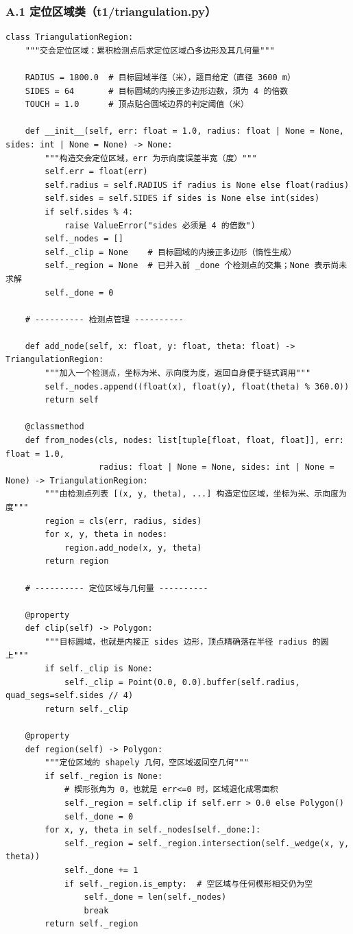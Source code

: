 \documentclass[UTF8, zihao=5,AutoFakeBold=2]{ctexart}
\begin{document}
	\subsubsection*{A.1 \quad 定位区域类（t1/triangulation.py）}
	\begin{lstlisting}
class TriangulationRegion:
    """交会定位区域：累积检测点后求定位区域凸多边形及其几何量"""

    RADIUS = 1800.0  # 目标圆域半径（米），题目给定（直径 3600 m）
    SIDES = 64       # 目标圆域的内接正多边形边数，须为 4 的倍数
    TOUCH = 1.0      # 顶点贴合圆域边界的判定阈值（米）

    def __init__(self, err: float = 1.0, radius: float | None = None, sides: int | None = None) -> None:
        """构造交会定位区域，err 为示向度误差半宽（度）"""
        self.err = float(err)
        self.radius = self.RADIUS if radius is None else float(radius)
        self.sides = self.SIDES if sides is None else int(sides)
        if self.sides % 4:
            raise ValueError("sides 必须是 4 的倍数")
        self._nodes = []
        self._clip = None    # 目标圆域的内接正多边形（惰性生成）
        self._region = None  # 已并入前 _done 个检测点的交集；None 表示尚未求解
        self._done = 0

    # ---------- 检测点管理 ----------

    def add_node(self, x: float, y: float, theta: float) -> TriangulationRegion:
        """加入一个检测点，坐标为米、示向度为度，返回自身便于链式调用"""
        self._nodes.append((float(x), float(y), float(theta) % 360.0))
        return self

    @classmethod
    def from_nodes(cls, nodes: list[tuple[float, float, float]], err: float = 1.0,
                   radius: float | None = None, sides: int | None = None) -> TriangulationRegion:
        """由检测点列表 [(x, y, theta), ...] 构造定位区域，坐标为米、示向度为度"""
        region = cls(err, radius, sides)
        for x, y, theta in nodes:
            region.add_node(x, y, theta)
        return region

    # ---------- 定位区域与几何量 ----------

    @property
    def clip(self) -> Polygon:
        """目标圆域，也就是内接正 sides 边形，顶点精确落在半径 radius 的圆上"""
        if self._clip is None:
            self._clip = Point(0.0, 0.0).buffer(self.radius, quad_segs=self.sides // 4)
        return self._clip

    @property
    def region(self) -> Polygon:
        """定位区域的 shapely 几何，空区域返回空几何"""
        if self._region is None:
            # 楔形张角为 0，也就是 err<=0 时，区域退化成零面积
            self._region = self.clip if self.err > 0.0 else Polygon()
            self._done = 0
        for x, y, theta in self._nodes[self._done:]:
            self._region = self._region.intersection(self._wedge(x, y, theta))
            self._done += 1
            if self._region.is_empty:  # 空区域与任何楔形相交仍为空
                self._done = len(self._nodes)
                break
        return self._region


\end{lstlisting}
\end{document}
